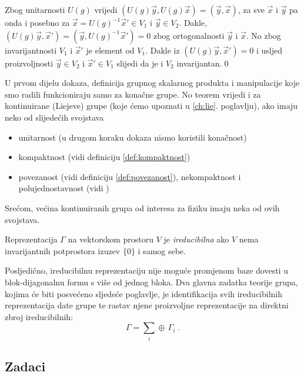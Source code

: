 Zbog unitarnosti $U(g)$ vrijedi $(U(g) \vec{y} , U(g)\vec{x}) = 
(\vec{y}, \vec{x})$,
za sve $\vec{x}$ i $\vec{y}$ pa onda i posebno za 
$\vec{x}=U(g)^{-1}\vec{x}'\in V_1$ i
$\vec{y} \in V_2$. Dakle, $(U(g)\vec{y}, \vec{x}')=(\vec{y}, U(g)^{-1}\vec{x}')
=0$ zbog ortogonalnosti $\vec{y}$ i $\vec{x}$.
No zbog invarijantnosti $V_1$ i $\vec{x}'$ je element od $V_1$. Dakle iz
$(U(g) \vec{y} , \vec{x}') = 0$ i usljed proizvoljnosti $\vec{y}\in V_2$
i $\vec{x}'\in V_1$ slijedi da je i $V_2$ invarijantan.\qed


U prvom dijelu dokaza, definicija grupnog skalarnog produkta i manipulacije
koje smo radili funkcioniraju samo za konačne grupe. No teorem vrijedi i 
za kontinuirane (Liejeve) grupe (koje ćemo upoznati u \ref{ch:lie}. poglavlju),
ako imaju neko od slijedećih svojstava
\begin{itemize}
\item unitarnost (u drugom koraku dokaza nismo koristili konačnost)
\item kompaktnost (vidi definiciju \ref{def:kompaktnost})
\item povezanost (vidi definiciju \ref{def:povezanost}), nekompaktnost i polujednostavnost (vidi \cite[79]{Cornwell:1997})
\end{itemize}
Srećom, većina kontinuiranih grupa od interesa za fiziku imaju neka od ovih svojstava.


\begin{definicija}
Reprezentacija $\Gamma$ na vektorskom prostoru $V$ je
\emph{ireducibilna} ako $V$ nema invarijantnih potprostora
izuzev $\{0\}$ i samog sebe.
\label{def:irrep}
\end{definicija}
Posljedično, ireducibilnu reprezentaciju nije moguće promjenom baze 
dovesti u blok-dijagonalnu formu s više od jednog bloka.
Dva glavna zadatka teorije grupa, kojima će biti posvećeno sljedeće poglavlje,
je identifikacija svih ireducibilnih reprezentacija date grupe te rastav
njene proizvoljne reprezentacije na direktni zbroj ireducibilnih:
\begin{displaymath}
  \Gamma = \sum_{i} \oplus\, \Gamma_{i} \;.
\end{displaymath}



\subsection*{Zadaci}

